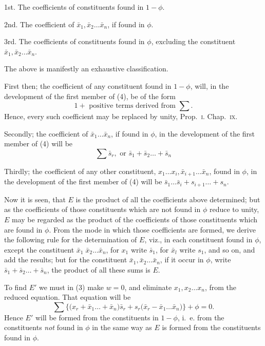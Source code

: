 \documentclass[oneside]{book}
\begin{document}
1st. The coefficients of constituents found in $1 - \phi$.

2nd. The coefficient of $\bar{x}_1, \bar{x}_2 \dotsc \bar{x}_n$, if found in $\phi$.

3rd. The coefficients of constituents found in $\phi$, excluding the
constituent $\bar{x}_1, \bar{x}_2 \dotsc \bar{x}_n$.

The above is manifestly an exhaustive classification.

First then; the coefficient of any constituent found in $1 - \phi$,
will, in the development of the first member of (4), be of the form
\[
  1 + \text{ positive terms derived from }\sum.
\]
Hence, every such coefficient may be replaced by unity, Prop.~\textsc{i.}
Chap.~\textsc{ix.}

Secondly; the coefficient of $\bar{x}_1 \dotsc \bar{x}_n$, if found in $\phi$, in the
development of the first member of (4) will be
\[
  \sum \bar{s}_r, \text{ or } \bar{s}_1 + \bar{s}_2 \dotsc + \bar{s}_n
\]

Thirdly; the coefficient of any other constituent, $x_1 \dotsc x_i,
\bar{x}_{i+1} \dotsc \bar{x}_n$, found in $\phi$, in the development of the first member
of (4) will be
$\bar{s}_1 \dotsc \bar{s}_i + s_{i+1} \dotsc + s_n$.

Now it is seen, that $E$ is the product of all the coefficients
above determined; but as the coefficients of those constituents
which are not found in $\phi$ reduce to unity, $E$ may be regarded as
the product of the coefficients of those constituents which are found
in $\phi$. From the mode in which those coefficients are formed, we
derive the following rule for the determination of $E$, viz., in
each constituent found in $\phi$, except the constituent
$\bar{x}_1 \; \bar{x}_2 \dotsc \bar{x}_n$,
for $x_1$ write $\bar{s}_1$, for $\bar{x}_l$ write $s_1$, and so on, and add the results;
but for the constituent $\bar{x}_1, \bar{x}_2 \dotsc \bar{x}_n$, if it occur in $\phi$, write $\bar{s}_1 + \bar{s}_2 \dotsc + \bar{s}_n$,
the product of all these sums is $E$.

To find $E'$ we must in (3) make $w = 0$, and eliminate
$x_1, x_2 \dotsc x_n$,
from the reduced equation. That equation will be
\[
  \sum \bigl\{
    \bigl( x_r + \bar{x}_1 \dotsc + \bar{x}_n \bigr)\bar{s}_r
         + s_r\bigl(\bar{x}_r - \bar{x}_1 \dotsc \bar{x}_n \bigr)
  \bigr\} + \phi = 0.  \tag{5}
\]
Hence $E'$ will be formed from the constituents in $1 - \phi$, i.~e.
from the constituents \emph{not} found in $\phi$ in the same way as $E$ is
formed from the constituents found in $\phi$.
\end{document}
